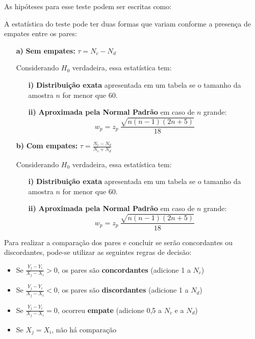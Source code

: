 \documentclass[
]{estat/estat}
\begin{document}
As hipóteses para esse teste podem ser escritas como:

A estatística do teste pode ter duas formas que variam conforme a
presença de empates entre os pares:

\begin{itemize}
    \item [\bf a)] \textbf{Sem empates:} $\displaystyle \tau = N_{c} - N_{d}$
    
    Considerando $H_{0}$ verdadeira, essa estatística tem:
    
    \begin{itemize}
        \item [\bf i)] \textbf{Distribuição exata} apresentada em um tabela se o tamanho da amostra $n$ for menor que 60.
        \item [\bf ii)] \textbf{Aproximada pela Normal Padrão} em caso de $n$ grande:
        $$ w_{p} = z_{p}\ \frac{\sqrt{n(n - 1)(2n + 5)}}{18} $$
    \end{itemize}
    
    \item [\bf b)] \textbf{Com empates:} $\displaystyle \tau = \frac{N_{c} - N_{d}}{N_{c} + N_{d}}$
    
    Considerando $H_{0}$ verdadeira, essa estatística tem:
    
    \begin{itemize}
        \item [\bf i)] \textbf{Distribuição exata} apresentada em um tabela se o tamanho da amostra $n$ for menor que 60.
        \item [\bf ii)] \textbf{Aproximada pela Normal Padrão} em caso de $n$ grande:
        $$ w_{p} = z_{p}\ \frac{\sqrt{n(n - 1)(2n + 5)}}{18} $$
    \end{itemize}
\end{itemize}

Para realizar a comparação dos pares e concluir se serão concordantes ou
discordantes, pode-se utilizar as seguintes regras de decisão:

\begin{itemize}
    \item Se $\displaystyle \frac{Y_{j} - Y_{i}}{X_{j} - X_{i}} > 0$, os pares são \textbf{concordantes} (adicione 1 a $N_{c}$)
    
    \item Se $\displaystyle \frac{Y_{j} - Y_{i}}{X_{j} - X_{i}} < 0$, os pares são \textbf{discordantes} (adicione 1 a $N_{d}$)
    
    \item Se $\displaystyle \frac{Y_{j} - Y_{i}}{X_{j} - X_{i}} = 0$, ocorreu \textbf{empate} (adicione 0,5 a $N_{c}$ e a $N_{d}$)
    
    \item Se $X_{j} = X_{i}$, não há comparação
\end{itemize}
\end{document}

